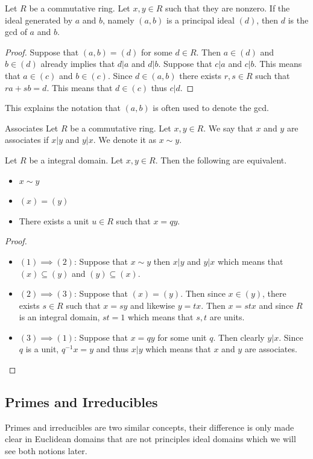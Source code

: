 \documentclass[a4paper]{article}
\begin{document}
\begin{prp}{}{} Let $R$ be a commutative ring. Let $x,y\in R$ such that they are nonzero. If the ideal generated by $a$ and $b$, namely $(a,b)$ is a principal ideal $(d)$, then $d$ is the gcd of $a$ and $b$. \tcbline
\begin{proof}
Suppose that $(a,b)=(d)$ for some $d\in R$. Then $a\in(d)$ and $b\in(d)$ already implies that $d|a$ and $d|b$. Suppose that $c|a$ and $c|b$. This means that $a\in(c)$ and $b\in(c)$. Since $d\in(a,b)$ there exists $r,s\in R$ such that $ra+sb=d$. This means that $d\in(c)$ thus $c|d$. 
\end{proof}
\end{prp}

This explains the notation that $(a,b)$ is often used to denote the gcd. 

\begin{defn}{Associates}{} Let $R$ be a commutative ring. Let $x,y\in R$. We say that $x$ and $y$ are associates if $x|y$ and $y|x$. We denote it as $x\sim y$. 
\end{defn}

\begin{prp}{}{} Let $R$ be a integral domain. Let $x,y\in R$. Then the following are equivalent. 
\begin{itemize}
\item $x\sim y$
\item $(x)=(y)$
\item There exists a unit $u\in R$ such that $x=qy$. 
\end{itemize} \tcbline
\begin{proof}
\begin{itemize}
\item $(1)\implies(2)$: Suppose that $x\sim y$ then $x|y$ and $y|x$ which means that $(x)\subseteq(y)$ and $(y)\subseteq(x)$. 
\item $(2)\implies(3)$: Suppose that $(x)=(y)$. Then since $x\in(y)$, there exists $s\in R$ such that $x=sy$ and likewise $y=tx$. Then $x=stx$ and since $R$ is an integral domain, $st=1$ which means that $s,t$ are units. 
\item $(3)\implies(1)$: Suppose that $x=qy$ for some unit $q$. Then clearly $y|x$. Since $q$ is a unit, $q^{-1}x=y$ and thus $x|y$ which means that $x$ and $y$ are associates. 
\end{itemize}
\end{proof}
\end{prp}

\subsection{Primes and Irreducibles}
Primes and irreducibles are two similar concepts, their difference is only made clear in Euclidean domains that are not principles ideal domains which we will see both notions later. 
\end{document}
